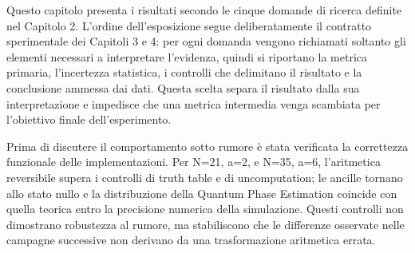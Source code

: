 
Questo capitolo presenta i risultati secondo le cinque domande di ricerca definite nel Capitolo 2. L'ordine dell'esposizione segue deliberatamente il contratto sperimentale dei Capitoli 3 e 4: per ogni domanda vengono richiamati soltanto gli elementi necessari a interpretare l'evidenza, quindi si riportano la metrica primaria, l'incertezza statistica, i controlli che delimitano il risultato e la conclusione ammessa dai dati. Questa scelta separa il risultato dalla sua interpretazione e impedisce che una metrica intermedia venga scambiata per l'obiettivo finale dell'esperimento.

Prima di discutere il comportamento sotto rumore è stata verificata la correttezza funzionale delle implementazioni. Per N=21, a=2, e N=35, a=6, l'aritmetica reversibile supera i controlli di truth table e di uncomputation; le ancille tornano allo stato nullo e la distribuzione della Quantum Phase Estimation coincide con quella teorica entro la precisione numerica della simulazione. Questi controlli non dimostrano robustezza al rumore, ma stabiliscono che le differenze osservate nelle campagne successive non derivano da una trasformazione aritmetica errata.

